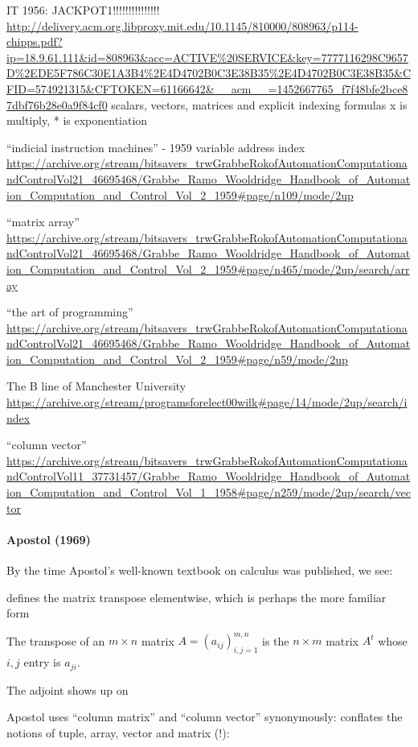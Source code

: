 IT 1956: JACKPOT1!!!!!!!!!!!!!!!
\url{http://delivery.acm.org.libproxy.mit.edu/10.1145/810000/808963/p114-chipps.pdf?ip=18.9.61.111&id=808963&acc=ACTIVE%20SERVICE&key=7777116298C9657D%2EDE5F786C30E1A3B4%2E4D4702B0C3E38B35%2E4D4702B0C3E38B35&CFID=574921315&CFTOKEN=61166642&__acm__=1452667765_f7f48bfe2bce87dbf76b28e0a9f84cf0}
scalars, vectors, matrices  and explicit indexing formulas
x is multiply, * is exponentiation


“indicial instruction machines” - 1959
variable address index
\url{https://archive.org/stream/bitsavers_trwGrabbeRokofAutomationComputationandControlVol21_46695468/Grabbe_Ramo_Wooldridge_Handbook_of_Automation_Computation_and_Control_Vol_2_1959#page/n109/mode/2up}

“matrix array”
\url{https://archive.org/stream/bitsavers_trwGrabbeRokofAutomationComputationandControlVol21_46695468/Grabbe_Ramo_Wooldridge_Handbook_of_Automation_Computation_and_Control_Vol_2_1959#page/n465/mode/2up/search/array}

“the art of programming”
\url{https://archive.org/stream/bitsavers_trwGrabbeRokofAutomationComputationandControlVol21_46695468/Grabbe_Ramo_Wooldridge_Handbook_of_Automation_Computation_and_Control_Vol_2_1959#page/n59/mode/2up}

The B line of Manchester University
\url{https://archive.org/stream/programsforelect00wilk#page/14/mode/2up/search/index}

“column vector”
\url{https://archive.org/stream/bitsavers_trwGrabbeRokofAutomationComputationandControlVol11_37731457/Grabbe_Ramo_Wooldridge_Handbook_of_Automation_Computation_and_Control_Vol_1_1958#page/n259/mode/2up/search/vector}


\paragraph{Apostol (1969)~\cite{Apostol1969}}

By the time Apostol's well-known textbook on calculus was published, we see:

\cite[p. 91]{Apostol1969} defines the matrix transpose elementwise, which is perhaps the more familiar form

The transpose of an $m \times n$ matrix
$A = {\left(a_{ij}\right)}^{m,n}_{i,j=1}$ is the $n \times m$ matrix $A^t$
whose $i, j$ entry is $a_{ji}$.

The adjoint shows up on \cite[p. 122]{Apostol1969}

Apostol uses ``column matrix'' and ``column vector'' synonymously: \cite[p. 592]{Apostol1967} conflates the notions of tuple, array, vector and matrix (!):

